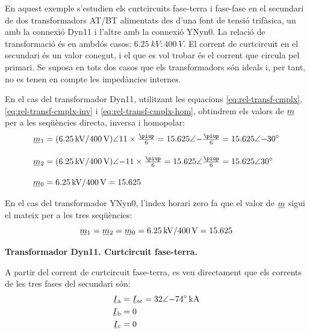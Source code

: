 	
\begin{exemple}[\CCasimSecTrafo{}]\label{ex:IccTrafos}
	\addcontentsxms{\CCasimSecTrafo}
    En aquest exemple s'estudien els curtcircuits fase-terra i fase-fase en el secundari de dos transformadors AT/BT alimentats des d'una font de tensió trifàsica, un amb la connexió Dyn11 i l'altre amb la connexió YNyn0. La relació de transformació és en ambdós casos: $\qty{6,25}{kV}\!:\!\qty{400}{V}$. El corrent de curtcircuit en el secundari és un valor conegut, i el que es vol trobar és el corrent que circula pel primari. Se suposa en tots dos casos que els transformadors són ideals i, per tant, no es tenen en compte les impedàncies internes.


    En el cas del transformador Dyn11, utilitzant les equacions \eqref{eq:rel-transf-cmplx}, \eqref{eq:rel-transf-cmplx-inv} i \eqref{eq:rel-transf-cmplx-hom}, obtindrem els valors de $\cmplx{m}$ per a les seqüències directa, inversa i homopolar:
    \begin{align*}
        \cmplx{m}_1 &= (\qty{6,25}{kV} / \qty{400}{V})\angle 11\times\tfrac{\piup}{6} =
        \num{15,625}\angle{-\tfrac{\piup}{6}} = \complexnum{15,625:-30} \\[1em]
        \cmplx{m}_2 &= (\qty{6,25}{kV} / \qty{400}{V})\angle {-11}\times\tfrac{\piup}{6} =
        \num{15,625}\angle \tfrac{\piup}{6} =\complexnum{15,625:30}  \\[1em]
        \cmplx{m}_0 &= \qty{6,25}{kV} / \qty{400}{V} = \num{15,625}
    \end{align*}

    En el cas del transformador YNyn0, l'index horari zero fa que el valor de $\cmplx{m}$ sigui el mateix per a les tres seqüències:
    \[
        \cmplx{m}_1 = \cmplx{m}_2 = \cmplx{m}_0 = \qty{6,25}{kV} / \qty{400}{V} = \num{15,625}
    \]

   \textbf{ Transformador Dyn11. Curtcircuit fase-terra.}

    \begin{center}
       
    \end{center}

    A partir del corrent de curtcircuit fase-terra, es veu directament que els corrents de les tres fases del secundari són:
    \begin{align*}
        \cmplx{I}\ped{a} &= \cmplx{I}\ped{sc} = \complexqty{32:-74}{kA} \\
        \cmplx{I}\ped{b} &= 0  \\
        \cmplx{I}\ped{c} &= 0
    \end{align*}


\end{exemple}
